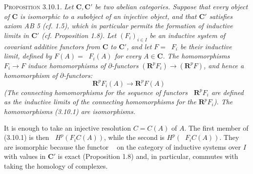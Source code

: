 \textsc{Proposition 3.10.1.} \textit{Let $\mathbf C,\mathbf C'$ be
two abelian categories. Suppose that every object of $\mathbf C$ is
isomorphic to a subobject of an injective object, and that $\mathbf C'$
satisfies axiom \textup{AB 5 (}cf. \textup{1.5)}, which in particular permits the formation of
inductive limits in $\mathbf C'$ \textup{(}cf. Proposition \textup{1.8)}. Let
$(F_i)_{i\in I}$ be an inductive system of covariant additive functors from
$\mathbf C$ to $\mathbf C'$, and let $F=\mathop{\underset{\to}{\lim}} F_i$ be their inductive
limit, defined by $F(A)=\mathop{\underset{\to}{\lim}} F_i(A)$ for every $A\in\mathbf C$. The
homomorphisms $F_i\to F$ induce homomorphisms of
$\partial$-functors $(\mathbf R^pF_i)\to(\mathbf R^pF)$, and
hence a homomorphism of $\partial$-functors:}
\[
\tag{3.10.1.}
\mathop{\underset{\to}{\lim}} \mathbf R^pF_i(A)\to \mathbf R^pF(A)
\]
\textit{\textup{(}The connecting homomorphisms for the sequence of functors
$\mathop{\underset{\to}{\lim}}\mathbf R^pF_i$ are defined as the inductive limits of the
connecting homomorphisms for the $\mathbf R^pF_i$\textup{)}. The homomorphisms
\textup{(3.10.1)} are isomorphisms.}

It is enough to take an injective resolution $C=C(A)$ of $A$. The first
member of (3.10.1) is then $\mathop{\underset{\to}{\lim}} H^p(F_iC(A))$, while the second is
$H^p(\mathop{\underset{\to}{\lim}} F_iC(A))$. They are isomorphic because the functor
$\mathop{\underset{\to}{\lim}}$ on the category of inductive systems over $I$ with values in
$\mathbf C'$ is exact (Proposition 1.8) and, in particular, commutes with
taking the homology of complexes.

